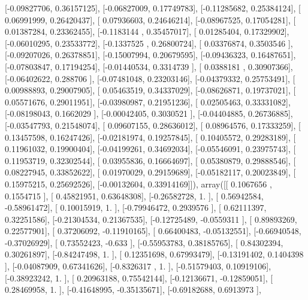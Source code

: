 \documentclass{article}
\begin{document}
       [-0.09827706,  0.36157125],
       [-0.06827009,  0.17749783],
       [-0.11285682,  0.25384124],
       [ 0.06991999,  0.26420437],
       [ 0.07936603,  0.24646214],
       [-0.08967525,  0.17054281],
       [ 0.01387284,  0.23362455],
       [-0.1183144 ,  0.35457017],
       [ 0.01285404,  0.17329902],
       [-0.06010295,  0.23533772],
       [-0.1337525 ,  0.26800724],
       [ 0.03376874,  0.3503546 ],
       [-0.09207026,  0.26378851],
       [-0.15007994,  0.20679595],
       [-0.09436323,  0.16487651],
       [-0.07803847,  0.17194254],
       [-0.01440534,  0.3314739 ],
       [ 0.0388181 ,  0.30907366],
       [-0.06402622,  0.288706  ],
       [-0.07481048,  0.23203146],
       [-0.04379332,  0.25753491],
       [ 0.00988893,  0.29007905],
       [ 0.05463519,  0.34337029],
       [-0.08626871,  0.19737021],
       [ 0.05571676,  0.29011951],
       [-0.03980987,  0.21951236],
       [ 0.02505463,  0.33331082],
       [-0.08198043,  0.1662029 ],
       [-0.00042405,  0.3030521 ],
       [-0.04404885,  0.26736885],
       [-0.03547793,  0.21548074],
       [ 0.09607155,  0.28636012],
       [ 0.08964576,  0.17333259],
       [ 0.13457598,  0.16247426],
       [-0.02181974,  0.19257845],
       [ 0.10405572,  0.29283189],
       [ 0.11961032,  0.19900404],
       [-0.04199261,  0.34692034],
       [-0.05546091,  0.23975743],
       [ 0.11953719,  0.32302544],
       [ 0.03955836,  0.16664697],
       [ 0.05380879,  0.29888546],
       [ 0.08227945,  0.33852622],
       [ 0.01970029,  0.29159689],
       [-0.05182117,  0.20023849],
       [ 0.15975215,  0.25692526],
       [-0.00132604,  0.33914169]]), array([[ 0.1067656 ,  0.1554715 ],
       [ 0.45821951,  0.63648308],
       [-0.26582728,  1.        ],
       [ 0.56942584, -0.58961472],
       [ 0.10015919,  1.        ],
       [-0.79946472,  0.2939576 ],
       [ 0.62111397,  0.32251586],
       [-0.21304534,  0.21367535],
       [-0.12725489, -0.0559311 ],
       [ 0.89893269,  0.22577901],
       [ 0.37206092, -0.11910165],
       [ 0.66400483, -0.05132551],
       [-0.66940548, -0.37026929],
       [ 0.73552423, -0.633     ],
       [-0.55953783,  0.38185765],
       [ 0.84302394,  0.30261897],
       [-0.84247498,  1.        ],
       [ 0.12351698,  0.67993479],
       [-0.13191402,  0.1404398 ],
       [-0.04087909,  0.67341626],
       [-0.8326317 ,  1.        ],
       [-0.51579403,  0.10919106],
       [-0.38923242,  1.        ],
       [ 0.20963188,  0.75542144],
       [-0.12136671, -0.12859051],
       [ 0.28469958,  1.        ],
       [-0.41648995, -0.35135671],
       [-0.69182688,  0.6913973 ],
\end{document}
